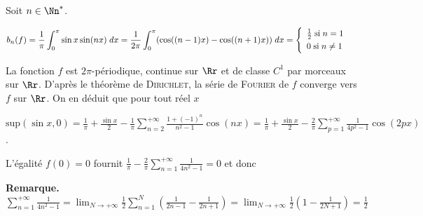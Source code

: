 {{Soit $n\in\Nn^*$.

\begin{align*}\ensuremath
b_n(f)&=\frac{1}{\pi}\int_{0}^{\pi}\sin x\sin(nx)\;dx=\frac{1}{2\pi}\int_{0}^{\pi}(\cos((n-1)x)-\cos((n+1)x))\;dx=\left\{
 \begin{array}{l}
 \frac{1}{2}\;\text{si}\;n=1\\
\rule{0mm}{4mm} 0\;\text{si}\;n\neq1
 \end{array}
 \right.\end{align*}

La fonction $f$ est $2\pi$-périodique, continue sur $\Rr$ et de classe $C^1$ par morceaux sur $\Rr$. D'après le théorème de \textsc{Dirichlet}, la série de \textsc{Fourier} de $f$ converge vers $f$ sur $\Rr$. On en déduit que pour tout réel $x$

\begin{center}
$\text{sup}(\sin x,0)=\frac{1}{\pi}+\frac{\sin x}{2}-\frac{1}{\pi}\sum_{n=2}^{+\infty}\frac{1+(-1)^n}{n^2-1}\cos(nx)=\frac{1}{\pi}+\frac{\sin x}{2}-\frac{2}{\pi}\sum_{p=1}^{+\infty}\frac{1}{4p^2-1}\cos(2px)$.
\end{center}

\begin{center}
\end{center}

L'égalité $f(0)=0$ fournit $\frac{1}{\pi}-\frac{2}{\pi}\sum_{n=1}^{+\infty}\frac{1}{4n^2-1}=0$ et donc

\begin{center}
\end{center}

\textbf{Remarque.} $\sum_{n=1}^{+\infty}\frac{1}{4n^2-1}=\lim_{N \rightarrow +\infty}\frac{1}{2}\sum_{n=1}^{N}\left(\frac{1}{2n-1}-\frac{1}{2n+1}\right)=\lim_{N \rightarrow +\infty}\frac{1}{2}\left(1-\frac{1}{2N+1}\right)=\frac{1}{2}$
}
}
